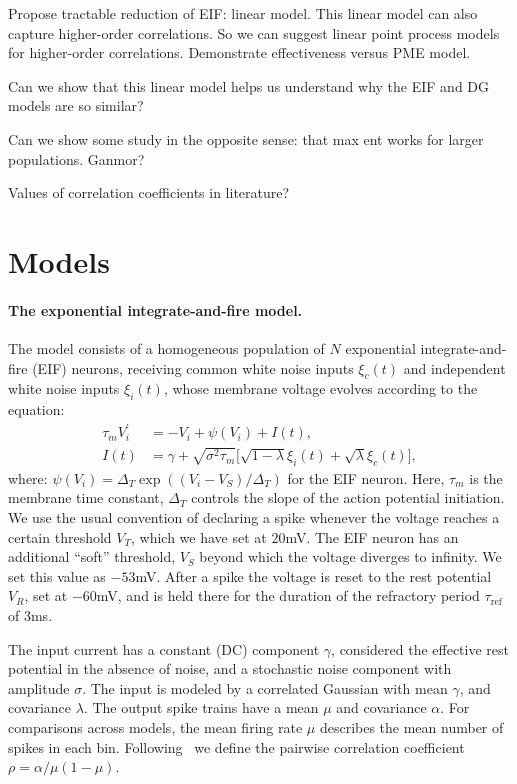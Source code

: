 \documentclass[%
 reprint,
 amsmath,amssymb,
 aps,
floatfix,
]{revtex4-1}
\begin{document}
Propose tractable reduction of EIF: linear model. This linear model can also capture higher-order correlations. So we can suggest linear point process models for higher-order correlations. Demonstrate effectiveness versus PME model.

Can we show that this linear model helps us understand why the EIF and DG models are so similar?

Can we show some study in the opposite sense: that max ent works for larger populations. Ganmor?

Values of correlation coefficients in literature?

 \colorbox{BrickRed}{\color{White}{Incomplete.}}

\section{\label{sec:models}Models}   %
\paragraph*{The exponential integrate-and-fire model.}
The model consists of a homogeneous population of $N$ exponential integrate-and-fire (EIF) neurons, receiving common white noise inputs $\xi_c(t)$ and independent white noise inputs $\xi_i(t)$, whose membrane voltage evolves according to the equation: 
\begin{align}
\label{eifsde}
\tau_m V_i^\prime &= -V_i +\psi(V_i)+I(t),\\
I(t) &= \gamma+\sqrt{\sigma^2\tau_m}\big[\sqrt{1-\lambda}\xi_i(t)+\sqrt{\lambda}\xi_c(t)\big] \nonumber,
\end{align}
where: $\psi(V_i) =\Delta_T \exp{\left((V_i - V_S)/\Delta_T\right)}$ for the EIF neuron. Here, $\tau_m$ is the membrane time constant, $\Delta_T$ controls the slope of the action potential initiation. We use the usual convention of declaring a spike whenever the voltage reaches a certain threshold $V_T$, which we have set at $20$mV. The EIF neuron has an additional ``soft'' threshold, $V_S$ beyond which the voltage diverges to infinity. We set this value as $-53$mV. After a spike the voltage is reset to the rest potential $V_R$, set at $-60$mV, and is held there for the duration of the refractory period $\tau_{\text{ref}}$ of $3$ms.

The input current has a constant (DC) component $\gamma$, considered the effective rest potential in the absence of noise, and a stochastic noise component with amplitude $\sigma$. The input is modeled by a correlated Gaussian with mean $\gamma$, and covariance $\lambda$. The output spike trains have a mean $\mu$ and covariance $\alpha$. For comparisons across models, the mean firing rate $\mu$ describes the mean number of spikes in each bin. Following~\cite{Macke:2011gw} we define the pairwise correlation coefficient $\rho = \alpha/\mu(1-\mu)$.
\end{document}
